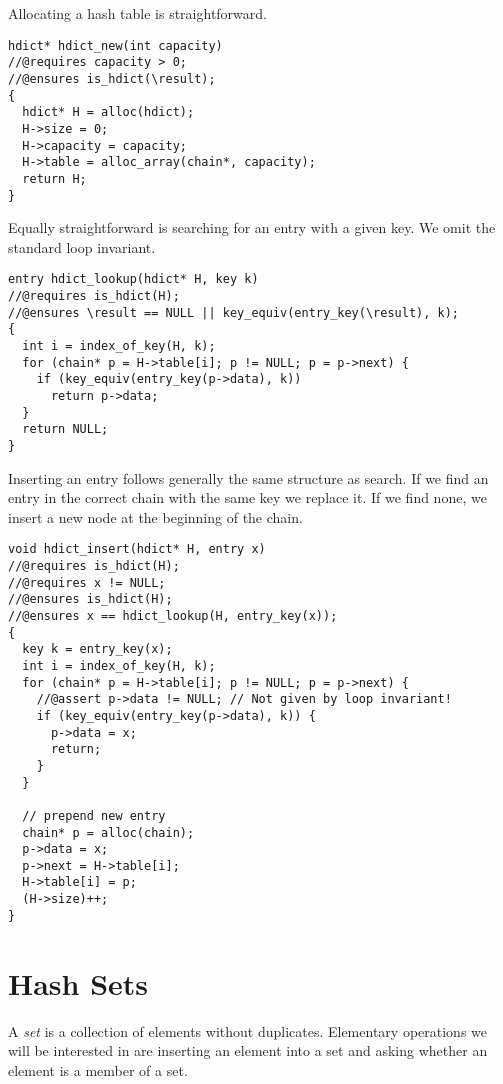 Allocating a hash table is straightforward.
\begin{lstlisting}[language={[C0]C}]
hdict* hdict_new(int capacity)
//@requires capacity > 0;
//@ensures is_hdict(\result);
{
  hdict* H = alloc(hdict);
  H->size = 0;
  H->capacity = capacity;
  H->table = alloc_array(chain*, capacity);
  return H;
}
\end{lstlisting}
Equally straightforward is searching for an entry with a given key.
We omit the standard loop invariant.
\begin{lstlisting}[language={[C0]C}]
entry hdict_lookup(hdict* H, key k)
//@requires is_hdict(H);
//@ensures \result == NULL || key_equiv(entry_key(\result), k);
{
  int i = index_of_key(H, k);
  for (chain* p = H->table[i]; p != NULL; p = p->next) {
    if (key_equiv(entry_key(p->data), k))
      return p->data;
  }
  return NULL;
}
\end{lstlisting}

Inserting an entry follows generally the same structure
as search.  If we find an entry in the correct chain with the
same key we replace it.  If we find none, we insert a new
node at the beginning of the chain.
\begin{lstlisting}[language={[C0]C}]
void hdict_insert(hdict* H, entry x)
//@requires is_hdict(H);
//@requires x != NULL;
//@ensures is_hdict(H);
//@ensures x == hdict_lookup(H, entry_key(x));
{
  key k = entry_key(x);
  int i = index_of_key(H, k);
  for (chain* p = H->table[i]; p != NULL; p = p->next) {
    //@assert p->data != NULL; // Not given by loop invariant!
    if (key_equiv(entry_key(p->data), k)) {
      p->data = x;
      return;
    }
  }

  // prepend new entry
  chain* p = alloc(chain);
  p->data = x;
  p->next = H->table[i];
  H->table[i] = p;
  (H->size)++;
}
\end{lstlisting}


\section{Hash Sets}
\label{sec:hdict:hash_sets}

A \emph{set} is a collection of elements without duplicates.
Elementary operations we will be interested in are inserting an
element into a set and asking whether an element is a member of a set.

